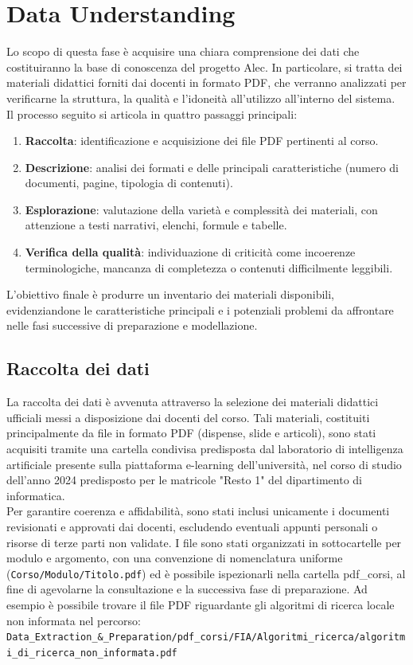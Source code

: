 \documentclass[a4paper,9pt]{article}
\begin{document}
	\section{Data Understanding}
	Lo scopo di questa fase è acquisire una chiara comprensione dei dati che costituiranno la base di conoscenza del progetto Alec. 
	In particolare, si tratta dei materiali didattici forniti dai docenti in formato PDF, che verranno analizzati per verificarne la struttura, la qualità e l’idoneità all’utilizzo all’interno del sistema.\\
	Il processo seguito si articola in quattro passaggi principali:
	\begin{enumerate}
		\item \textbf{Raccolta}: identificazione e acquisizione dei file PDF pertinenti al corso.
		\item \textbf{Descrizione}: analisi dei formati e delle principali caratteristiche (numero di documenti, pagine, tipologia di contenuti).
		\item \textbf{Esplorazione}: valutazione della varietà e complessità dei materiali, con attenzione a testi narrativi, elenchi, formule e tabelle.
		\item \textbf{Verifica della qualità}: individuazione di criticità come incoerenze terminologiche, mancanza di completezza o contenuti difficilmente leggibili.
	\end{enumerate}
	L’obiettivo finale è produrre un inventario dei materiali disponibili, evidenziandone le caratteristiche principali e i potenziali problemi da affrontare nelle fasi successive di preparazione e modellazione.
	
	\subsection{Raccolta dei dati}
	La raccolta dei dati è avvenuta attraverso la selezione dei materiali didattici ufficiali messi a disposizione dai docenti del corso. 
	Tali materiali, costituiti principalmente da file in formato PDF (dispense, slide e articoli), sono stati acquisiti tramite una cartella condivisa predisposta dal laboratorio di intelligenza artificiale presente sulla piattaforma e-learning dell'università, nel corso di studio dell'anno 2024 predisposto per le matricole "Resto 1" del dipartimento di informatica.\\
	Per garantire coerenza e affidabilità, sono stati inclusi unicamente i documenti revisionati e approvati dai docenti, escludendo eventuali appunti personali o risorse di terze parti non validate. I file sono stati organizzati in sottocartelle per modulo e argomento, con una convenzione di nomenclatura uniforme (\texttt{Corso/Modulo/Titolo.pdf}) ed è possibile ispezionarli nella cartella pdf\_corsi, al fine di agevolarne la consultazione e la successiva fase di preparazione. Ad esempio è possibile trovare il file PDF riguardante gli algoritmi di ricerca locale non informata nel percorso:\\ \texttt{Data\_Extraction\_\&\_Preparation/pdf\_corsi/FIA/Algoritmi\_ricerca/\newline algoritmi\_di\_ricerca\_non\_informata.pdf}
	
\end{document}
